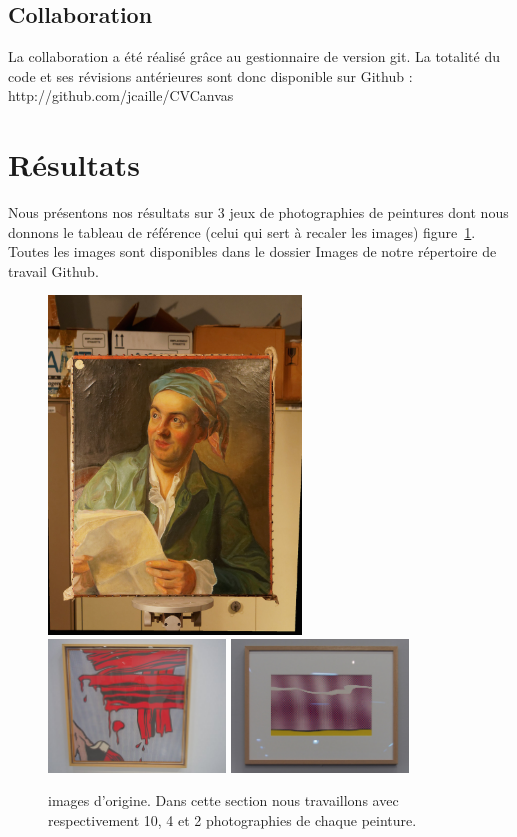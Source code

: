 \documentclass[12pt,a4paper]{article}
\begin{document}
\subsection{Collaboration}
La collaboration a été réalisé grâce au gestionnaire de version git. La totalité du code et ses révisions antérieures sont donc disponible sur Github : http://github.com/jcaille/CVCanvas

\section{Résultats}
Nous présentons nos résultats sur 3 jeux de photographies de peintures dont nous donnons le tableau de référence (celui qui sert à recaler les images) figure~\ref{input}. Toutes les images sont disponibles dans le dossier Images de notre répertoire de travail Github. 
\begin{figure}
\centering
\includegraphics[width=0.6\textwidth]{../Images/Man_Right/16.jpg}\\
\includegraphics[width=0.42\textwidth]{../Images/Brush/0.jpg}
\includegraphics[width=0.42\textwidth]{../Images/Pink/30.jpg}
\caption{images d'origine. Dans cette section nous travaillons avec respectivement 10, 4 et 2 photographies de chaque peinture.}
\label{input}
\end{figure}
\end{document}
